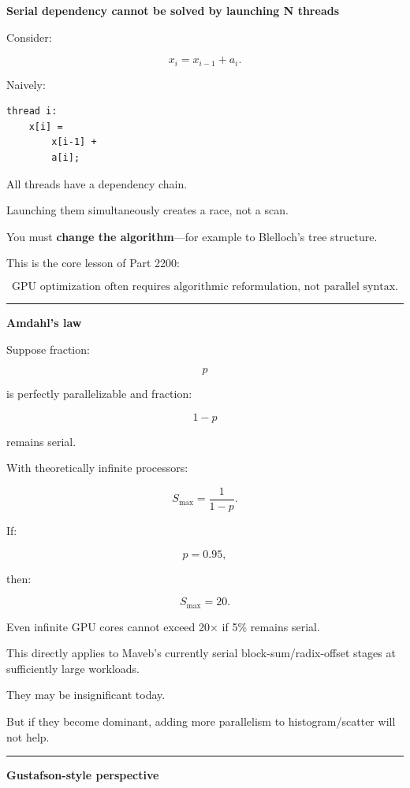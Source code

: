 \textbf{Serial dependency cannot be solved by launching N threads}

Consider:

\[
x_i=
x_{i-1}+a_i.
\]

Naively:

\protect{}\label{p10-bad-prefix}%
\begin{verbatim}
thread i:
    x[i] =
        x[i-1] +
        a[i];
\end{verbatim}

All threads have a dependency chain.

Launching them simultaneously creates a race, not a scan.

You must \textbf{change the algorithm}---for example to Blelloch's tree structure.

This is the core lesson of Part 2200:

\[
\boxed{
\text{GPU optimization often requires algorithmic reformulation, not parallel syntax}.
}
\]

\begin{center}\rule{0.5\linewidth}{0.5pt}\end{center}

\textbf{Amdahl's law}

Suppose fraction:

\[
p
\]

is perfectly parallelizable and fraction:

\[
1-p
\]

remains serial.

With theoretically infinite processors:

\[
\boxed{
S_{\max}
=
\frac1{1-p}.
}
\]

If:

\[
p=0.95,
\]

then:

\[
S_{\max}=20.
\]

Even infinite GPU cores cannot exceed 20× if 5\% remains serial.

This directly applies to Maveb's currently serial block-sum/radix-offset stages at sufficiently large workloads.

They may be insignificant today.

But if they become dominant, adding more parallelism to histogram/scatter will not help.

\begin{center}\rule{0.5\linewidth}{0.5pt}\end{center}

\textbf{Gustafson-style perspective}

